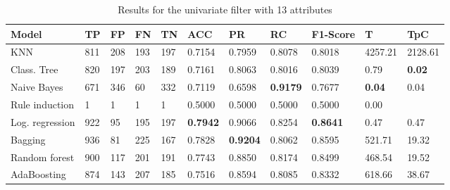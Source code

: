 \documentclass[a4paper,11pt]{article}
\begin{document}
\begin{table}
\centering

\begin{tabular}{|l|l|l|l|l|l|l|l|l|l|l|}
\hline

\textbf{Model} & \textbf{TP} & \textbf{FP} & \textbf{FN} & \textbf{TN} & \textbf{ACC} & \textbf{PR} & \textbf{RC} & \textbf{F1-Score} & \textbf{T} & \textbf{TpC} \\ \hline
KNN & 811 & 208 & 193 & 197 & 0.7154 & 0.7959 & 0.8078 & 0.8018 & 4257.21 & 2128.61 \\ \hline
Class. Tree & 820 & 197 & 203 & 189 & 0.7161 & 0.8063 & 0.8016 & 0.8039 & 0.79 & \textbf{0.02} \\ \hline
Naive Bayes & 671 & 346 & 60 & 332 & 0.7119 & 0.6598 & \textbf{0.9179} & 0.7677 & \textbf{0.04} & 0.04 \\ \hline
Rule induction & 1 & 1 & 1 & 1 & 0.5000 & 0.5000 & 0.5000 & 0.5000 & 0.00 \\ \hline
Log. regression & 922 & 95 & 195 & 197 & \textbf{0.7942} & 0.9066 & 0.8254 & \textbf{0.8641} & 0.47 & 0.47 \\ \hline
Bagging & 936 & 81 & 225 & 167 & 0.7828 & \textbf{0.9204} & 0.8062 & 0.8595 & 521.71 & 19.32 \\ \hline
Random forest & 900 & 117 & 201 & 191 & 0.7743 & 0.8850 & 0.8174 & 0.8499 & 468.54 & 19.52 \\ \hline
AdaBoosting & 874 & 143 & 207 & 185 & 0.7516 & 0.8594 & 0.8085 & 0.8332 & 618.66 & 38.67 \\ \hline

\end{tabular}
\caption{Results for the univariate filter with 13 attributes}
\label{class:f50u}
\end{table}
\end{document}

